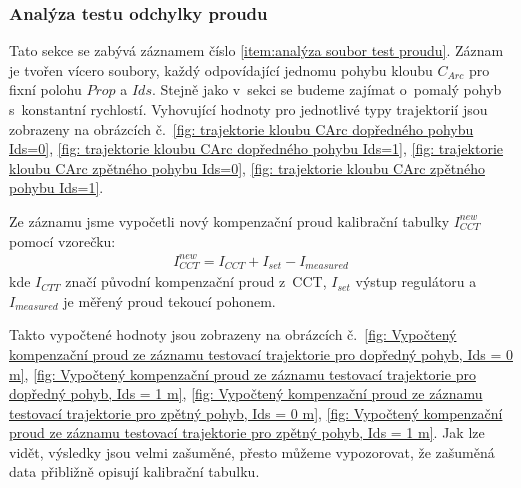 \subsubsection{Analýza testu odchylky proudu}
Tato sekce se zabývá záznamem číslo \ref{item:analýza soubor test proudu}. Záznam je tvořen vícero soubory, každý odpovídající
jednomu pohybu kloubu $C_{Arc}$ pro fixní polohu $Prop$ a $Ids$. Stejně jako v~sekci  se budeme zajímat o~pomalý pohyb s~konstantní rychlostí. Vyhovující hodnoty pro jednotlivé typy trajektorií jsou zobrazeny na obrázcích č.~\ref{fig: trajektorie kloubu CArc dopředného pohybu Ids=0}, \ref{fig: trajektorie kloubu CArc dopředného pohybu Ids=1}, \ref{fig: trajektorie kloubu CArc zpětného pohybu Ids=0}, \ref{fig: trajektorie kloubu CArc zpětného pohybu Ids=1}.\par
Ze záznamu jsme vypočetli nový kompenzační proud kalibrační tabulky $I_{CCT}^{new}$ pomocí vzorečku:
\begin{align}
    I_{CCT}^{new} = I_{CCT} + I_{set} - I_{measured}
\end{align}
kde $I_{CTT}$ značí původní kompenzační proud z~CCT, $I_{set}$ výstup regulátoru a $I_{measured}$ je měřený proud tekoucí pohonem. \par
Takto vypočtené hodnoty jsou zobrazeny na obrázcích č.~\ref{fig: Vypočtený kompenzační proud ze záznamu testovací trajektorie pro dopředný pohyb, Ids = 0 m}, \ref{fig: Vypočtený kompenzační proud ze záznamu testovací trajektorie pro dopředný pohyb, Ids = 1 m}, \ref{fig: Vypočtený kompenzační proud ze záznamu testovací trajektorie pro zpětný pohyb, Ids = 0 m}, \ref{fig: Vypočtený kompenzační proud ze záznamu testovací trajektorie pro zpětný pohyb, Ids = 1 m}. Jak lze vidět, výsledky jsou velmi zašuměné, přesto můžeme vypozorovat, že zašuměná data přibližně opisují kalibrační tabulku.
